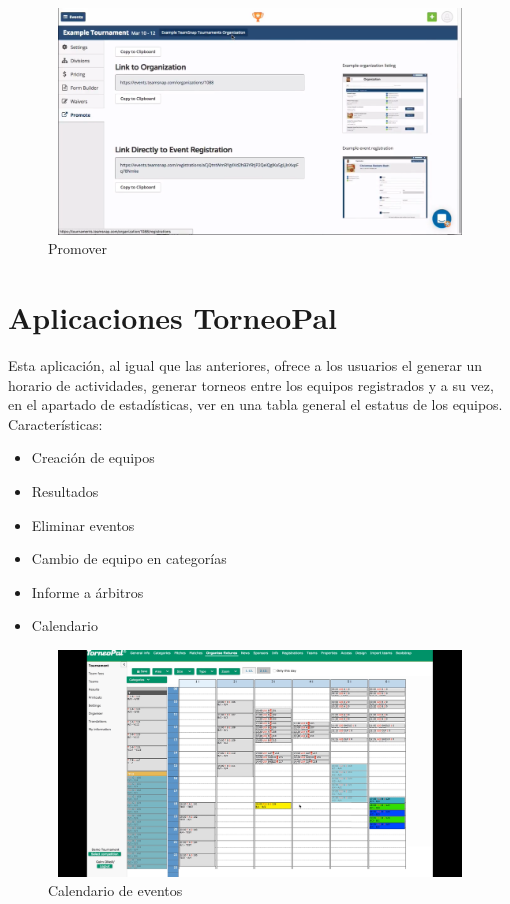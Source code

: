 \begin{figure}[hbt]
	\centering
	\includegraphics[width=12cm, height=6cm]{Imagenes/Aplicaciones/TsT3.png}
	\caption{Promover}
\end{figure}
\pagebreak


\section{Aplicaciones TorneoPal}
\noindent Esta aplicación, al igual que las anteriores, ofrece a los usuarios el generar un horario de actividades, generar torneos entre los equipos registrados y a su vez, en el apartado de estadísticas, ver en una tabla general el estatus de los equipos. \cite{tp}
Características: 
\begin{itemize}
	\item Creación de equipos
	\item Resultados
	\item Eliminar eventos
	\item Cambio de equipo en categorías
	\item Informe a árbitros
	\item Calendario
	
\end{itemize}
\begin{figure}[h!]
	\centering
	\includegraphics[width=12cm, height=6cm]{Imagenes/Aplicaciones/TP1.png}
	\caption{Calendario de eventos}
\end{figure}
